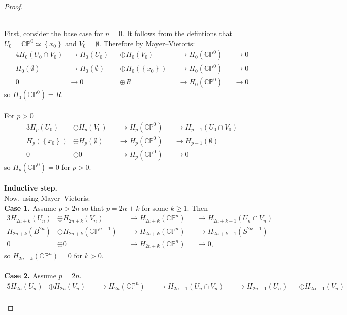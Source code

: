 \documentclass{article}
\newcommand{\set}[1]{\left\{ #1 \right\}}
\newcommand{\ra}{\rightarrow}
\begin{document}
\begin{proof}
\begin{enumerate}[(a)]
    \\
    First, consider the base case for $n=0$. It follows from the
    defintions that $U_0 = \mathbb{CP}^0 \simeq \set{x_0}$ and $V_0 = \emptyset$.
    Therefore by Mayer--Vietoris:
    \begin{alignat*}{4}
      H_0(U_0 \cap V_0)
      &\ra H_0(U_0) &&\oplus H_0(V_0)
      &&\ra H_0(\mathbb{CP}^0)
      &&\ra 0\\
      H_0(\emptyset)
      &\ra H_0(\emptyset) &&\oplus H_0(\set{x_0})
      &&\ra H_0(\mathbb{CP}^0)
      &&\ra 0\\
      0
      &\ra 0 &&\oplus R
      &&\ra H_0(\mathbb{CP}^0)
      &&\ra 0
    \end{alignat*} so $H_0(\mathbb{CP}^0) = R$.
    \\~\\ For $p > 0$ \begin{alignat*}{3}
      H_p(U_0) &\oplus H_p(V_0)
      &&\ra H_p(\mathbb{CP}^0)
      &&\ra H_{p - 1}(U_0 \cap V_0)\\
      H_p(\set{x_0}) &\oplus H_p(\emptyset)
      &&\ra H_p(\mathbb{CP}^0)
      &&\ra H_{p - 1}(\emptyset)\\
      0 &\oplus 0
      &&\ra H_p(\mathbb{CP}^0)
      &&\ra 0
    \end{alignat*} so $H_p(\mathbb{CP}^0) = 0$ for $p > 0$.
    \\~\\
    \textbf{Inductive step.}\\
    Now, using Mayer--Vietoris:
    \\
    \textbf{Case 1.} Assume $p > 2n$ so that $p = 2n + k$ for some $k \geq 1$. Then
    \begin{alignat*}{3}
      H_{2n + k}(U_n) &\oplus H_{2n + k}(V_n)
      &&\ra H_{2n + k}(\mathbb{CP}^n)
      &&\ra H_{2n + k - 1}(U_n \cap V_n) \\
      H_{2n + k}(B^{2n}) &\oplus H_{2n + k}(\mathbb{CP}^{n-1})
      &&\ra H_{2n + k}(\mathbb{CP}^n)
      &&\ra H_{2n + k - 1}(S^{2n - 1}) \\
      0 &\oplus 0
      &&\ra H_{2n + k}(\mathbb{CP}^n)
      &&\ra 0,
    \end{alignat*} so $H_{2n + k}(\mathbb{CP}^n) = 0$ for $k > 0$.
    \\~\\
    \textbf{Case 2.} Assume $p = 2n$.
    \begin{alignat*}{5}
      H_{2n}(U_n) &\oplus H_{2n}(V_n)
      &&\ra H_{2n}(\mathbb{CP}^n)
      &&\ra H_{2n - 1}(U_n \cap V_n)
      &&\ra H_{2n-1}(U_n) &&\oplus H_{2n-1}(V_n)\\

\end{alignat*}
\end{enumerate}
\end{proof}
\end{document}
